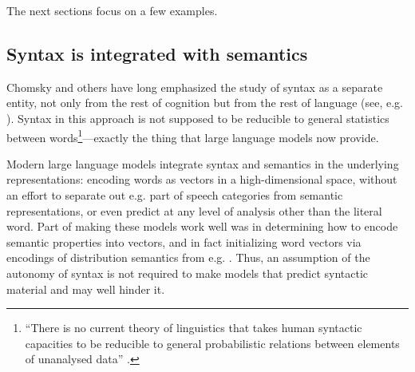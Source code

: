 \documentclass[output=paper,colorlinks,citecolor=brown
]{langscibook}
\begin{document}
The next sections focus on a few examples. 

\subsection*{Syntax is integrated with semantics}
Chomsky and others have long emphasized the study of syntax as a separate entity, not only from the rest of cognition but from the rest of language (see, e.g. \cite{chomsky1957syntactic,croft1995autonomy,newmeyer1991functional,adger2018autonomy}). Syntax in this approach is not supposed to be reducible to general statistics between words\footnote{``There is no current theory of linguistics
that takes human syntactic capacities to be reducible to general probabilistic relations between elements of unanalysed data'' \citep{adger2018autonomy}.}---exactly the thing that large language models now provide. 

Modern large language models integrate syntax and semantics in the underlying representations: encoding words as vectors in a high-dimensional space, without an effort to separate out e.g. part of speech categories from semantic representations, or even predict at any level of analysis other than the literal word. Part of making these models work well was in determining how to encode semantic properties into vectors, and in fact initializing word vectors via encodings of distribution semantics from e.g. \cite{mikolov2013distributed} \citep{radford2019language}. Thus, an assumption of the autonomy of syntax is not required to make models that predict syntactic material and may well hinder it. 
\end{document}

